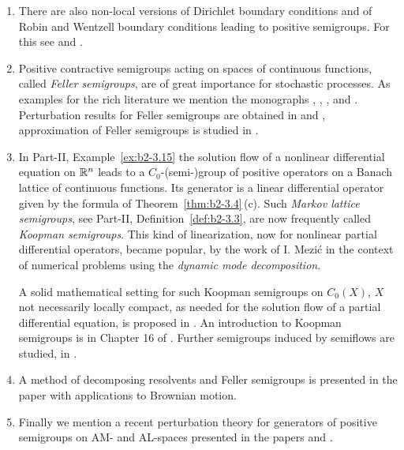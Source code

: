 \begin{enumerate}
\item
There are also non-local versions of Dirichlet boundary conditions  and of Robin and Wentzell boundary conditions leading to positive semigroups. 
For this see \textcite{zbmath07220470} and \textcite{arXiv:2502.03216}. 

\item
Positive contractive semigroups acting on spaces of continuous functions, called \emph{Feller semigroups}, are of great importance for stochastic processes. 
As examples for the rich literature we mention the monographs \textcite{zbmath06314001}, \textcite{zbmath05714362}, \textcite{zbmath01707584}, \textcite{zbmath01807482}  and  \textcite{zbmath02189175}. 
Perturbation results for Feller semigroups are obtained in \textcite{zbmath06286612} and \textcite{zbmath07606117}, approximation of Feller semigroups is studied in  \textcite{zbmath07694938}.


\item
In Part-II, Example~\ref{ex:b2-3.15} the solution flow of a nonlinear differential
equation on $\mathbb{R}^{n}$ leads to a $C_{0}$-(semi-)group of
positive operators  on a Banach lattice of continuous functions. 
Its generator is a linear differential operator given by the formula of Theorem~\ref{thm:b2-3.4}\,\upshape(c).
Such \emph{Markov lattice semigroups}, see Part-II, Definition~\ref{def:b2-3.3}, are now
frequently called \emph{Koopman semigroups}. 
This kind of linearization, now for nonlinear partial differential operators, became popular, \eg by the work of I. Mezi\'{c} \cite{zbmath05045798} in the context of numerical problems using the \emph{dynamic mode decomposition}. 

A solid mathematical setting for such Koopman semigroups
on $C_{0}(X)$, $X$ not necessarily locally compact, as needed for the solution flow of a partial differential equation,  is proposed in \textcite{MR4176386}. 
An introduction to Koopman semigroups is in Chapter 16  of \textcite{zbmath06695787}.
Further semigroups induced by semiflows are studied, \eg in \textcite{zbmath07995939}.

\item 
A method of decomposing resolvents and Feller semigroups is presented in the paper \textcite{zbmath07986074} with applications to Brownian motion.

\item
Finally we mention a recent perturbation theory for generators of positive semigroups on AM- and AL-spaces presented in the papers \textcite{zbmath07971662} and \textcite{zbmath06893038}.

\end{enumerate}
